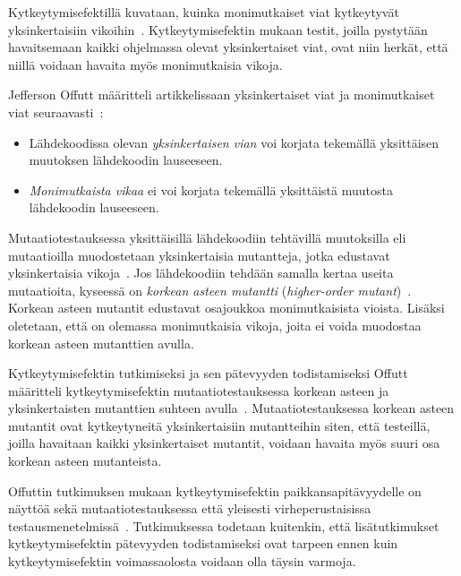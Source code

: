 \documentclass[finnish, grading]{tktltiki2}
\theoremstyle{definition}
\theoremstyle{remark}
\begin{document}
Kytkeytymisefektillä kuvataan, kuinka monimutkaiset viat kytkeytyvät yksinkertaisiin vikoihin~\cite[s. 35]{DeMillo:Lipton:Sayward:1978}. Kytkeytymisefektin mukaan testit, joilla pystytään havaitsemaan kaikki ohjelmassa olevat yksinkertaiset viat, ovat niin herkät, että niillä voidaan havaita myös monimutkaisia vikoja. 

Jefferson Offutt määritteli artikkelissaan yksinkertaiset viat ja monimutkaiset viat seuraavasti~\cite[s. 6]{Offutt:1992:Coupling}:
\begin{itemize}
  \item Lähdekoodissa olevan \textit{yksinkertaisen vian} voi korjata tekemällä yksittäisen muutoksen lähdekoodin lauseeseen.
  \item \textit{Monimutkaista vikaa} ei voi korjata tekemällä yksittäistä muutosta lähdekoodin lauseeseen.
\end{itemize}
Mutaatiotestauksessa yksittäisillä lähdekoodiin tehtävillä muutoksilla eli mutaatioilla muodostetaan yksinkertaisia mutantteja, jotka edustavat yksinkertaisia vikoja~\cite[s. 6]{Offutt:1992:Coupling}. Jos lähdekoodiin tehdään samalla kertaa useita mutaatioita, kyseessä on \textit{korkean asteen mutantti} (\textit{higher-order mutant})~\cite[s. 6]{Offutt:1992:Coupling}. Korkean asteen mutantit edustavat osajoukkoa monimutkaisista vioista. Lisäksi oletetaan, että on olemassa monimutkaisia vikoja, joita ei voida muodostaa korkean asteen mutanttien avulla.

Kytkeytymisefektin tutkimiseksi ja sen pätevyyden todistamiseksi Offutt määritteli kytkeytymisefektin mutaatiotestauksessa korkean asteen ja yksinkertaisten mutanttien suhteen avulla~\cite[s. 6]{Offutt:1992:Coupling}. Mutaatiotestauksessa korkean asteen mutantit ovat kytkeytyneitä yksinkertaisiin mutantteihin siten, että testeillä, joilla havaitaan kaikki yksinkertaiset mutantit, voidaan havaita myös suuri osa korkean asteen mutanteista. 

Offuttin tutkimuksen mukaan kytkeytymisefektin paikkansapitävyydelle on näyttöä sekä mutaatiotestauksessa että yleisesti virheperustaisissa testausmenetelmissä~\cite[s. 6]{Offutt:1992:Coupling}. Tutkimuksessa todetaan kuitenkin, että lisätutkimukset kytkeytymisefektin pätevyyden todistamiseksi ovat tarpeen ennen kuin kytkeytymisefektin voimassaolosta voidaan olla täysin varmoja.

\end{document}
